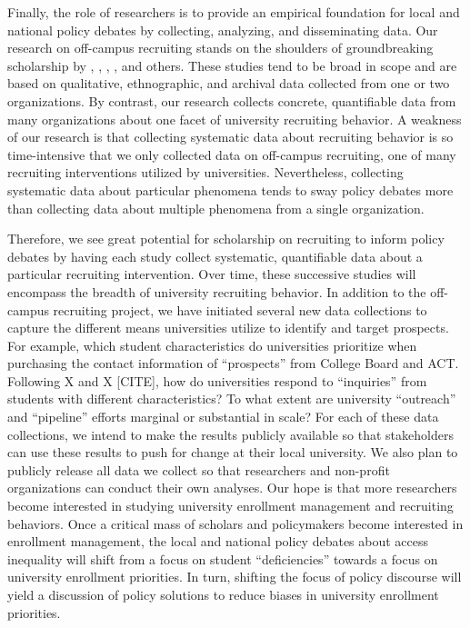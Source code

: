 \documentclass[twoside]{article}
\begin{document}
Finally, the role of researchers is to provide an empirical foundation for local and national policy debates by collecting, analyzing, and disseminating data.  Our research on off-campus recruiting stands on the shoulders of groundbreaking scholarship by \cite{RN1100}, \cite{RN3519}, \cite{RN4407}, \cite{RN4324}, and others.  These studies tend to be broad in scope and are based on qualitative, ethnographic, and archival data collected from one or two organizations. By contrast, our research collects concrete, quantifiable data from  many organizations about one facet of university recruiting behavior. A weakness of our research is that collecting systematic data about recruiting behavior is so time-intensive that we only collected data on off-campus recruiting, one of many recruiting interventions utilized by universities. Nevertheless, collecting systematic data about particular phenomena tends to sway policy debates more than collecting data about multiple phenomena from a single organization. 

Therefore, we see great potential for scholarship on recruiting to inform policy debates by having each study collect systematic, quantifiable data about a particular recruiting intervention. Over time, these successive studies will encompass the breadth of university recruiting behavior.  In addition to the off-campus recruiting project, we have initiated several new data collections to capture the different means universities utilize to identify and target prospects.  For example, which student characteristics do universities prioritize when purchasing the contact information of ``prospects'' from College Board and ACT.  Following X and X [CITE], how do universities respond to ``inquiries'' from students with different characteristics? To what extent are university ``outreach'' and ``pipeline'' efforts marginal or substantial in scale? For each of these data collections, we intend to make the results publicly available so that stakeholders can use these results to push for change at their local university. We also plan to publicly release all data we collect so that researchers and non-profit organizations can conduct their own analyses.  Our hope is that more researchers become interested in studying university enrollment management and recruiting behaviors.  Once a critical mass of scholars and policymakers become interested in enrollment management, the local and national policy debates about access inequality will shift from a focus on student ``deficiencies'' towards a focus on university enrollment priorities.  In turn, shifting the focus of policy discourse will yield a discussion of policy solutions to reduce biases in university enrollment priorities.


\newpage


\def\bibfont{\small}




\newpage
\pagecolor{LightBlue}
\begin{titlepage}
    \color{LightBlue}{x}
\end{titlepage}
\end{document}
